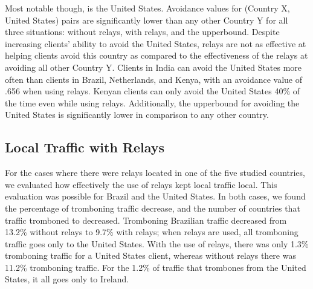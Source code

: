 Most notable though, is the United States.  Avoidance values for (Country X, United States) pairs are significantly lower than any other Country Y for all three situations: without relays, with relays, and the upperbound.   Despite increasing clients' ability to avoid the United States, relays are not as effective at helping clients avoid this country as compared to the effectiveness of the relays at avoiding all other Country Y.  Clients in India can avoid the United States more often than clients in Brazil, Netherlands, and Kenya, with an avoidance value of .656 when using relays.  Kenyan clients can only avoid the United States 40\% of the time even while using relays.  Additionally, the upperbound for avoiding the United States is significantly lower in comparison to any other country.  

\subsection{Local Traffic with Relays}
For the cases where there were relays located in one of the five studied countries, we evaluated how effectively the use of relays kept local traffic local.  This evaluation was possible for Brazil and the United States.  In both cases, we found the percentage of tromboning traffic decrease, and the number of countries that traffic tromboned to decreased.  Tromboning Brazilian traffic decreased from 13.2\% without relays to 9.7\% with relays; when relays are used, all tromboning traffic goes only to the United States.  With the use of relays, there was only 1.3\% tromboning traffic for a United States client, whereas without relays there was 11.2\% tromboning traffic.  For the 1.2\% of traffic that trombones from the United States, it all goes only to Ireland.
